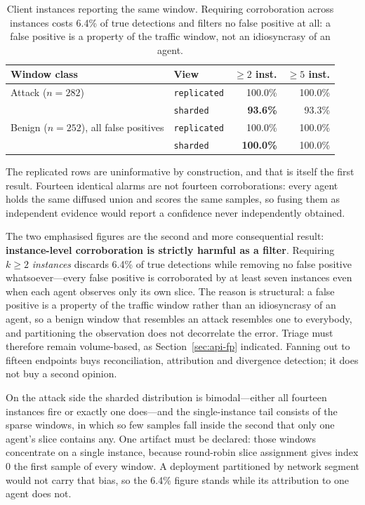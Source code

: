 \begin{table}[htbp]
\centering
\caption{Client instances reporting the same window. Requiring corroboration across
instances costs 6.4\% of true detections and filters no false positive at all: a false
positive is a property of the traffic window, not an idiosyncrasy of an agent.}
\label{tab:corrob}
\begin{tabular}{@{}llrr@{}}
\toprule
Window class & View & $\geq 2$ inst. & $\geq 5$ inst. \\
\midrule
Attack ($n=282$) & \texttt{replicated} & 100.0\% & 100.0\% \\
                 & \texttt{sharded} & \textbf{93.6\%} & 93.3\% \\
\addlinespace
Benign ($n=252$), all false positives & \texttt{replicated} & 100.0\% & 100.0\% \\
                 & \texttt{sharded} & \textbf{100.0\%} & 100.0\% \\
\bottomrule
\end{tabular}
\end{table}

The replicated rows are uninformative by construction, and that is itself the first result.
Fourteen identical alarms are not fourteen corroborations: every agent holds the same
diffused union and scores the same samples, so fusing them as independent evidence would
report a confidence never independently obtained.

The two emphasised figures are the second and more consequential result:
\textbf{instance-level corroboration is strictly harmful as a filter}. Requiring $k \geq 2$
\emph{instances} discards 6.4\% of true detections while removing no false positive
whatsoever---every false positive is corroborated by at least seven instances even when each
agent observes only its own slice. The reason is structural: a false positive is a property
of the traffic window rather than an idiosyncrasy of an agent, so a benign window that
resembles an attack resembles one to everybody, and partitioning the observation does not
decorrelate the error. Triage must therefore remain volume-based, as
Section~\ref{sec:api-fp} indicated. Fanning out to fifteen endpoints buys reconciliation,
attribution and divergence detection; it does not buy a second opinion.

On the attack side the sharded distribution is bimodal---either all fourteen instances fire
or exactly one does---and the single-instance tail consists of the sparse windows, in which
so few samples fall inside the second that only one agent's slice contains any. One artifact
must be declared: those windows concentrate on a single instance, because round-robin slice
assignment gives index 0 the first sample of every window. A deployment partitioned by network
segment would not carry that bias, so the 6.4\% figure stands while its attribution to one
agent does not.

